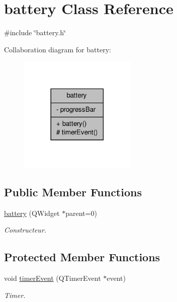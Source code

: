 \hypertarget{classbattery}{\section{battery Class Reference}
\label{classbattery}
}


{\ttfamily \#include \char`\"{}battery.\-h\char`\"{}}



Collaboration diagram for battery\-:\nopagebreak
\begin{figure}[H]
\begin{center}
\leavevmode
\includegraphics[width=158pt]{classbattery__coll__graph}
\end{center}
\end{figure}
\subsection*{Public Member Functions}
\begin{DoxyCompactItemize}
\item 
\hyperlink{classbattery_a5fa1ba3fd447e78847e63f5733e157af}{battery} (Q\-Widget $\ast$parent=0)
\begin{DoxyCompactList}\small\item\em Constructeur. \end{DoxyCompactList}\end{DoxyCompactItemize}
\subsection*{Protected Member Functions}
\begin{DoxyCompactItemize}
\item 
void \hyperlink{classbattery_a22c4b7b9932a588d61fde097aa7a91a5}{timer\-Event} (Q\-Timer\-Event $\ast$event)
\begin{DoxyCompactList}\small\item\em Timer. \end{DoxyCompactList}\end{DoxyCompactItemize}
